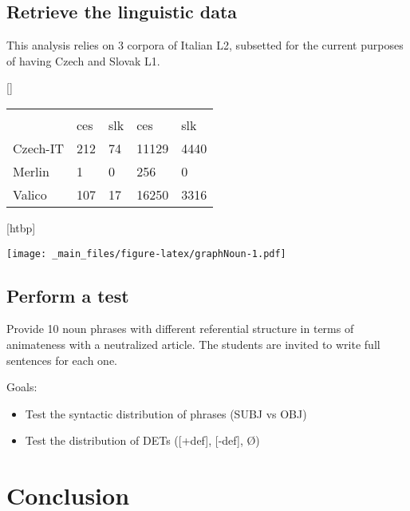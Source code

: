 \documentclass[a4paper,twoside,12pt,chapterprefix=false,listof=flat]{scrartcl}
\makeatletter
\providecommand{\tightlist}{%
  \setlength{\itemsep}{0pt}\setlength{\parskip}{0pt}}
\def\fps@figure{htbp}
\renewenvironment{figure}[1][\fps@figure]{
  \edef\@tempa{\noexpand\@float{figure}[#1]} 
  \@tempa
  \sffamily
}{
  \end@float
}
\renewenvironment{table}[1][\fps@table]{
  \edef\@tempa{\noexpand\@float{table}[#1]} 
  \@tempa
  \sffamily
  \footnotesize
}{
  \end@float
}
\theoremstyle{plain} %
\theoremstyle{definition}
\theoremstyle{remark}
\makeatother
\begin{document}
\subsection{Retrieve the linguistic
data}\label{retrieve-the-linguistic-data}

This analysis relies on 3 corpora of Italian L2, subsetted for the
current purposes of having Czech and Slovak L1.

\begin{table}

\caption{\label{tab:unnamed-chunk-5}Amount of data in the collection}
\centering
\begin{tabu} to 
\toprule
{} &  &  \\
\cmidrule(l{2pt}r{2pt}){2-3} \cmidrule(l{2pt}r{2pt}){4-5}
  & ces & slk & ces & slk\\
\midrule
Czech-IT & 212 & 74 & 11129 & 4440\\
Merlin & 1 & 0 & 256 & 0\\
Valico & 107 & 17 & 16250 & 3316\\
\bottomrule
\end{tabu}
\end{table}

\begin{figure}
\centering
\texttt{[image: \_main\_files/figure-latex/graphNoun-1.pdf]}
\caption{\label{fig:graphNoun}Bi-grams distribution of elements near Nouns}
\end{figure}

\subsection{Perform a test}\label{perform-a-test}

Provide 10 noun phrases with different referential structure in terms of
animateness with a neutralized article. The students are invited to
write full sentences for each one.

Goals:

\begin{itemize}
\tightlist
\item
  Test the syntactic distribution of phrases (SUBJ vs OBJ)
\item
  Test the distribution of DETs ({[}+def{]}, {[}-def{]}, Ø)
\end{itemize}

\section{Conclusion}\label{sec:concl}
\end{document}
